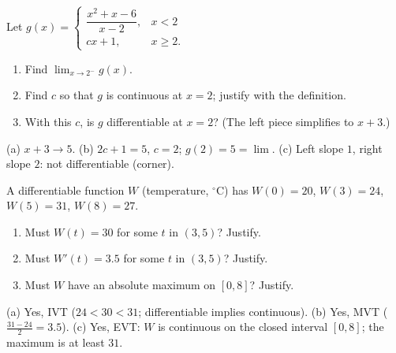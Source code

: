 \begin{exo}{}
Let $g(x)=\begin{cases}\dfrac{x^2+x-6}{x-2}, & x<2\\[4pt] cx+1, & x\ge2.\end{cases}$
\begin{enumerate}[label=(\alph*)]
\item Find $\lim_{x\to2^-}g(x)$.
\item Find $c$ so that $g$ is continuous at $x=2$; justify with the definition.
\item With this $c$, is $g$ differentiable at $x=2$? (The left piece simplifies to $x+3$.)
\end{enumerate}
\work{3.5cm}
\begin{solution}
(a) $x+3\to5$. (b) $2c+1=5$, $c=2$; $g(2)=5=\lim$. (c) Left slope $1$, right slope $2$: not differentiable (corner).
\end{solution}
\end{exo}
\begin{exo}{}
A differentiable function $W$ (temperature, $^\circ$C) has $W(0)=20$, $W(3)=24$, $W(5)=31$, $W(8)=27$.
\begin{enumerate}[label=(\alph*)]
\item Must $W(t)=30$ for some $t$ in $(3,5)$? Justify.
\item Must $W'(t)=3.5$ for some $t$ in $(3,5)$? Justify.
\item Must $W$ have an absolute maximum on $[0,8]$? Justify.
\end{enumerate}
\work{3.5cm}
\begin{solution}
(a) Yes, IVT ($24<30<31$; differentiable implies continuous). (b) Yes, MVT ($\frac{31-24}{2}=3.5$). (c) Yes, EVT: $W$ is continuous on the closed interval $[0,8]$; the maximum is at least $31$.
\end{solution}
\end{exo}

